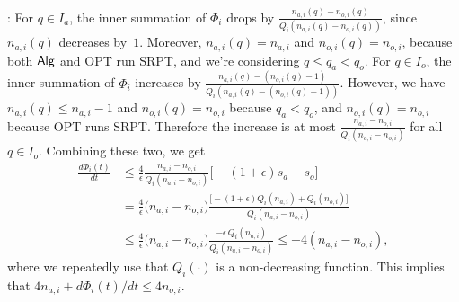 \documentclass[11pt]{article}
\newcommand{\opt}{\textrm{\sc OPT}\xspace}
\newcommand{\tsty}{}
\newcommand{\alg}{\ensuremath{{\sf Alg}}\xspace}
\newcommand{\constun}{\frac{4}{\epsilon}}
\newcommand{\dphidt}{{\frac{d \Phi_i(t)}{dt}}}
\newcommand{\dphidtside}{d \Phi_i(t)/dt}
\begin{document}
\medskip {}: For $q \in I_a$, the inner summation of $\Phi_i$ drops by $
\frac{n_{a,i}(q) - n_{o,i}(q)}{Q_i(n_{a,i}(q) - n_{o,i}(q))}$, since
$n_{a,i}(q)$ decreases by~$1$. Moreover, $n_{a,i}(q) = n_{a,i}$ and
$n_{o,i}(q) = n_{o,i}$, because both \alg and \opt run
SRPT, and we're considering $q \leq q_a < q_o$.  For $q \in I_o$, the
inner summation of $\Phi_i$ increases by $\frac{n_{a,i}(q) - (n_{o,i}(q)
  - 1)}{Q_i( n_{a,i}(q) - (n_{o,i}(q) - 1))}$.  However, we have
$n_{a,i}(q) \leq n_{a,i} - 1$ and $n_{o,i}(q) = n_{o,i}$ because $q_a <
q_o$, and $n_{o,i}(q) = n_{o,i}$ because \opt runs SRPT.  Therefore the
increase is at most $\frac{n_{a,i} - n_{o,i}}{Q_i(n_{a,i} - n_{o,i})}$
for all $q \in I_o$. Combining these two, we get
\begin{align*}
  \tsty \dphidt &\leq \tsty \constun \frac{n_{a,i} - n_{o,i}}{Q_i(n_{a,i}
    - n_{o,i})} \big[ -(1+\epsilon) s_a + s_o \big] \\
  &= \tsty \constun \big( n_{a,i} - n_{o,i} \big) \frac {\big[ -(1+\epsilon) Q_i(n_{a,i}) + Q_i(n_{o,i}) \big]} {Q_i(n_{a,i} - n_{o,i} )}  \\
  &\leq \tsty \constun \big( n_{a,i} - n_{o,i} \big)\frac{ -\epsilon\,
    Q_i(n_{a,i}) } {Q_i(n_{a,i} - n_{o,i})} \leq - 4 (n_{a,i} -
  n_{o,i}),
\end{align*}
where we repeatedly use that $Q_i(\cdot)$ is a non-decreasing function.
This implies that $4 n_{a,i} + \dphidtside \leq 4 n_{o,i}$.
\end{document}
